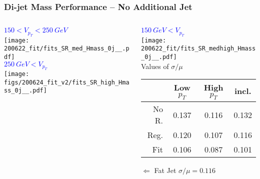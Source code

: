 \documentclass{beamer}
\begin{document}
\begin{frame}
  \frametitle{Di-jet Mass Performance -- No Additional Jet}

  \begin{columns}
    \begin{column}{0.5\linewidth}
      \centering
      \textcolor{blue}{$150 < V_{p_T} < \SI{250}{GeV}$} \\
      \texttt{[image: 200622\_fit/fits\_SR\_med\_Hmass\_0j\_\_.pdf]} \\
      \textcolor{blue}{$\SI{250}{GeV} < V_{p_T}$} \\
      \texttt{[image: figs/200624\_fit\_v2/fits\_SR\_high\_Hmass\_0j\_\_.pdf]}
    \end{column}
    \begin{column}{0.5\linewidth}
      \begin{center}
      \textcolor{blue}{$\SI{150}{GeV} < V_{p_T}$} \\
      \texttt{[image: 200622\_fit/fits\_SR\_medhigh\_Hmass\_0j\_\_.pdf]} \\

      Values of $\sigma/\mu$
      {\scriptsize
      \begin{tabular}{|r|c|c|c|}
        \hline
        & Low $p_T$ & High $p_T$ & incl. \\
        \hline
        No R. & 0.137 & 0.116 & 0.132 \\
        Reg.  & 0.120 & 0.107 & 0.116 \\
        Fit   & 0.106 & 0.087 & 0.101 \\
        \hline
      \end{tabular}
      }
      \end{center}
      $\Leftarrow$ Fat Jet $\sigma/\mu = 0.116$
    \end{column}
  \end{columns}

\end{frame}
\end{document}

